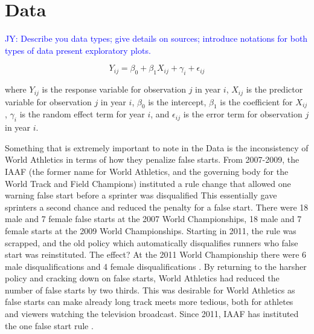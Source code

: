 \documentclass[12pt, letterpaper, titlepage]{article}
\newcommand{\jy}[1]{\textcolor{blue}{JY: #1}}
\begin{document}







\section{Data} \label{sec:data}

\jy{Describe you data types; give details on sources; introduce notations for
  both types of data
  present exploratory plots.}

  \begin{equation}
    Y_{ij} = \beta_0 + \beta_1 X_{ij} + \gamma_i + \epsilon_{ij}
    \end{equation}
    
    where $Y_{ij}$ is the response variable for observation $j$ in year $i$, 
    $X_{ij}$ is the predictor variable for observation $j$ in year $i$, 
    $\beta_0$ is the intercept, $\beta_1$ is the coefficient for $X_{ij}$, 
    $\gamma_i$ is the random effect term for year $i$, and $\epsilon_{ij}$ 
    is the error term for observation $j$ in year $i$.

Something that is extremely important to note in the Data is the inconsistency of World Athletics 
in terms of how they penalize false starts.  From 2007-2009, the IAAF (the former name for World 
Athletics, and the governing body for the World Track and Field Champions) instituted a rule change
that allowed one warning false start before a sprinter was disqualified \citep{False-Start}  This 
essentially gave sprinters a second chance and reduced the penalty for a false start.  There were 
18 male and 7 female false starts at the 2007 World Championships, 18 male and 7 female starts at 
the 2009 World Championships. Starting in 2011, the rule was scrapped, and the old policy which 
automatically disqualifies runners who false start was reinstituted.  The effect? At the 2011 World
Championship there were 6 male disqualifications and 4 female disqualifications \citep{False-Start}. 
By returning to the harsher policy and cracking down on false starts, World Athletics had reduced the
number of false starts by two thirds. This was desirable for World Athletics as false starts can 
make already long track meets more tedious, both for athletes and viewers watching the 
television broadcast.  Since 2011, IAAF has instituted the one false start rule
\citep{Pilianidis}.
\end{document}
